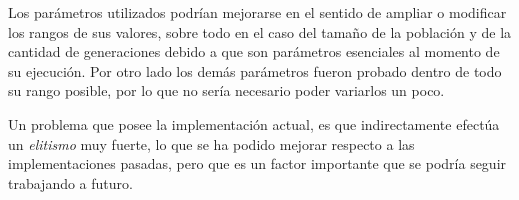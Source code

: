 Los parámetros utilizados podrían mejorarse en el sentido de  ampliar o modificar los rangos de sus valores, sobre todo
en el caso del tamaño de la población y de la cantidad de generaciones debido a que son parámetros esenciales al momento
de su ejecución. Por otro lado los demás parámetros fueron probado dentro de todo su rango posible, por lo que no sería
necesario poder variarlos un poco.

Un problema que posee la implementación actual, es que indirectamente efectúa un \emph{elitismo} muy fuerte, lo que se ha
podido mejorar respecto a las implementaciones pasadas, pero que es un factor importante que se podría seguir trabajando a futuro.

